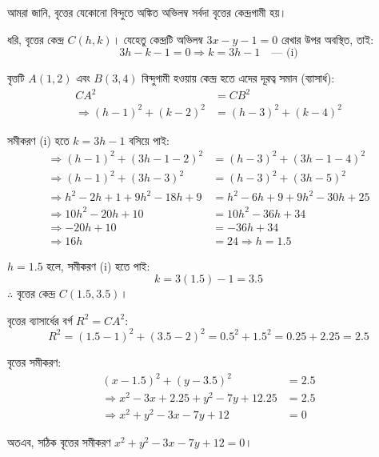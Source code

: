 \documentclass[12pt, a4paper]{article}
\begin{document}
\begin{tcolorbox}[solutionbox={সমাধান (Solution)}]
    \noindent
    আমরা জানি, বৃত্তের যেকোনো বিন্দুতে অঙ্কিত অভিলম্ব সর্বদা বৃত্তের কেন্দ্রগামী হয়। 
    
    \vspace{0.5em}
    ধরি, বৃত্তের কেন্দ্র $C(h, k)$। যেহেতু কেন্দ্রটি অভিলম্ব $3x - y - 1 = 0$ রেখার উপর অবস্থিত, তাই:
    \[ 3h - k - 1 = 0 \Rightarrow k = 3h - 1 \quad \text{--- (i)} \]
    
    \vspace{0.5em}
    বৃত্তটি $A(1, 2)$ এবং $B(3, 4)$ বিন্দুগামী হওয়ায় কেন্দ্র হতে এদের দূরত্ব সমান (ব্যাসার্ধ):
    \begin{align*}
        CA^2 &= CB^2 \\
        \Rightarrow (h - 1)^2 + (k - 2)^2 &= (h - 3)^2 + (k - 4)^2
    \end{align*}
    
    \vspace{0.5em}
    সমীকরণ (i) হতে $k = 3h - 1$ বসিয়ে পাই:
    \begin{align*}
        \Rightarrow (h - 1)^2 + (3h - 1 - 2)^2 &= (h - 3)^2 + (3h - 1 - 4)^2 \\
        \Rightarrow (h - 1)^2 + (3h - 3)^2 &= (h - 3)^2 + (3h - 5)^2 \\
        \Rightarrow h^2 - 2h + 1 + 9h^2 - 18h + 9 &= h^2 - 6h + 9 + 9h^2 - 30h + 25 \\
        \Rightarrow 10h^2 - 20h + 10 &= 10h^2 - 36h + 34 \\
        \Rightarrow -20h + 10 &= -36h + 34 \\
        \Rightarrow 16h &= 24 \Rightarrow h = 1.5
    \end{align*}
    
    \vspace{0.5em}
    $h = 1.5$ হলে, সমীকরণ (i) হতে পাই:
    \[ k = 3(1.5) - 1 = 3.5 \]
    $\therefore$ বৃত্তের কেন্দ্র $C(1.5, 3.5)$। 
    
    \vspace{0.5em}
    বৃত্তের ব্যাসার্ধের বর্গ $R^2 = CA^2$:
    \[ R^2 = (1.5 - 1)^2 + (3.5 - 2)^2 = 0.5^2 + 1.5^2 = 0.25 + 2.25 = 2.5 \]
    
    \vspace{0.5em}
    বৃত্তের সমীকরণ:
    \begin{align*}
        (x - 1.5)^2 + (y - 3.5)^2 &= 2.5 \\
        \Rightarrow x^2 - 3x + 2.25 + y^2 - 7y + 12.25 &= 2.5 \\
        \Rightarrow x^2 + y^2 - 3x - 7y + 12 &= 0
    \end{align*}
    
    \vspace{0.5em}
    অতএব, সঠিক বৃত্তের সমীকরণ $x^2 + y^2 - 3x - 7y + 12 = 0$।
\end{tcolorbox}
\end{document}
